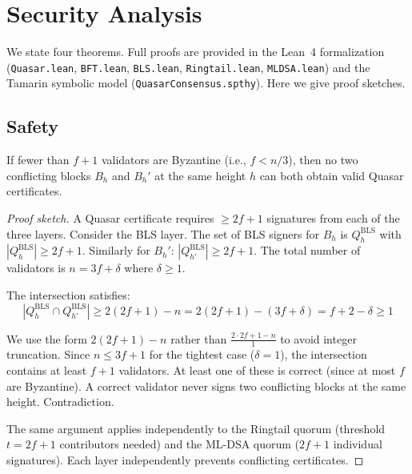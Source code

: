 \section{Security Analysis}

\label{sec:security}

We state four theorems. Full proofs are provided in the Lean~4 formalization
(\texttt{Quasar.lean}, \texttt{BFT.lean}, \texttt{BLS.lean},
\texttt{Ringtail.lean}, \texttt{MLDSA.lean}) and the Tamarin symbolic model
(\texttt{QuasarConsensus.spthy}). Here we give proof sketches.

\subsection{Safety}

\begin{theorem}[Safety]
\label{thm:safety}
If fewer than $f+1$ validators are Byzantine (i.e., $f < n/3$), then no two
conflicting blocks $B_h$ and $B_h'$ at the same height $h$ can both obtain
valid Quasar certificates.
\end{theorem}

\begin{proof}[Proof sketch]
A Quasar certificate requires $\geq 2f+1$ signatures from each of the three
layers. Consider the BLS layer. The set of BLS signers for $B_h$ is
$Q^{\mathrm{BLS}}_h$ with $|Q^{\mathrm{BLS}}_h| \geq 2f+1$. Similarly for
$B_h'$: $|Q^{\mathrm{BLS}}_{h'}| \geq 2f+1$. The total number of validators
is $n = 3f + \delta$ where $\delta \geq 1$.

The intersection satisfies:
\[
|Q^{\mathrm{BLS}}_h \cap Q^{\mathrm{BLS}}_{h'}| \geq
2(2f+1) - n = 2(2f+1) - (3f+\delta) = f + 2 - \delta \geq 1
\]

We use the form $2(2f+1) - n$ rather than $\frac{2 \cdot 2f+1 - n}{1}$ to
avoid integer truncation. Since $n \leq 3f+1$ for the tightest case
($\delta = 1$), the intersection contains at least $f+1$ validators. At least
one of these is correct (since at most $f$ are Byzantine). A correct validator
never signs two conflicting blocks at the same height. Contradiction.

The same argument applies independently to the Ringtail quorum (threshold
$t = 2f+1$ contributors needed) and the ML-DSA quorum ($2f+1$ individual
signatures). Each layer independently prevents conflicting certificates.
\end{proof}

